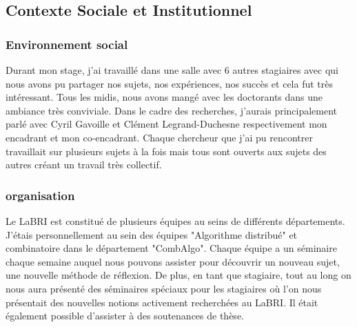 \subsection{Contexte Sociale et Institutionnel}

\subsubsection{Environnement social}

Durant mon stage, j'ai travaillé dans une salle avec 6 autres stagiaires avec qui nous avons pu partager nos sujets, nos expériences, nos succès et cela fut très intéressant. Tous les midis, nous avons mangé avec les doctorants dans une ambiance très conviviale. 
Dans le cadre des recherches, j'aurais principalement parlé avec Cyril Gavoille et Clément Legrand-Duchesne respectivement mon encadrant et mon co-encadrant. Chaque chercheur que j'ai pu rencontrer travaillait sur plusieurs sujets à la fois mais tous sont ouverts aux sujets des autres créant un travail très collectif.

\subsubsection{organisation} Le LaBRI est constitué de plusieurs équipes au seins de différents départements. J'étais personnellement au sein des équipes "Algorithme distribué" et combinatoire dans le département "CombAlgo". Chaque équipe a un séminaire chaque semaine auquel nous pouvons assister pour découvrir un nouveau sujet, une nouvelle méthode de réflexion. De plus, en tant que stagiaire, tout au long on nous aura présenté des séminaires spéciaux pour les stagiaires où l'on nous présentait des nouvelles notions activement recherchées au LaBRI. Il était également possible d'assister à des soutenances de thèse.